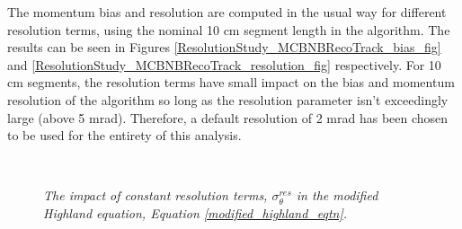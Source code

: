 The momentum bias and resolution are computed in the usual way for different resolution terms, using the nominal 10 cm segment length in the algorithm. The results can be seen in Figures \ref{ResolutionStudy_MCBNBRecoTrack_bias_fig} and \ref{ResolutionStudy_MCBNBRecoTrack_resolution_fig} respectively. For 10 cm segments, the resolution terms have small impact on the bias and momentum resolution of the algorithm so long as the resolution parameter isn't exceedingly large (above 5 mrad). Therefore, a default resolution of 2 mrad has been chosen to be used for the entirety of this analysis.

\begin{figure}
\centering
\mbox{
	\quad
	}
\caption{\textit{The impact of constant resolution terms, $\sigma_\theta^{res}$ in the modified Highland equation, Equation \ref{modified_highland_eqtn}.}}
\end{figure}


